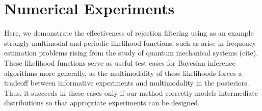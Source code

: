 \documentclass[twoside]{article}
\newtheorem{lemma}{Lemma}
\begin{document}
%
%

\section{Numerical Experiments}
\label{sec:numerical-experiments}

Here, we demonstrate the effectiveness of rejection filtering using as an
example strongly multimodal and periodic likelihood functions, such as arise
in frequency estimation problems rising from the study of quantum mechanical
systems (cite). These likelihood functions serve as useful test cases for
Bayesian inference algorithms more generally, as the multimodality of these
likelihoods forces a tradeoff between informative experiments and
multimodality in the posteriors. Thus, it succeeds in these cases only
if our method correctly models intermediate distributions so that appropriate
experiments can be designed.
\end{document}
